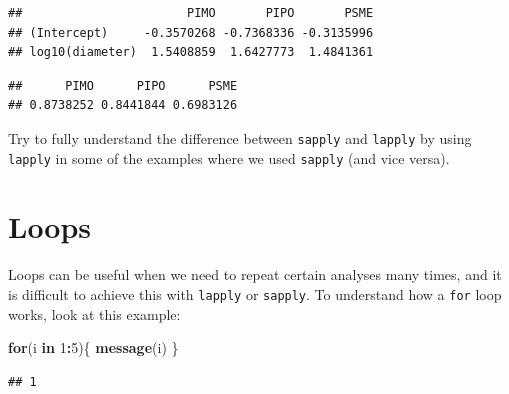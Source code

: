 \documentclass[]{book}
\newenvironment{Shaded}{\begin{snugshade}}{\end{snugshade}}
\newcommand{\CommentTok}[1]{\textcolor[rgb]{0.56,0.35,0.01}{\textit{#1}}}
\newcommand{\ControlFlowTok}[1]{\textcolor[rgb]{0.13,0.29,0.53}{\textbf{#1}}}
\newcommand{\DecValTok}[1]{\textcolor[rgb]{0.00,0.00,0.81}{#1}}
\newcommand{\KeywordTok}[1]{\textcolor[rgb]{0.13,0.29,0.53}{\textbf{#1}}}
\newcommand{\NormalTok}[1]{#1}
\newcommand{\OperatorTok}[1]{\textcolor[rgb]{0.81,0.36,0.00}{\textbf{#1}}}
\newcommand{\StringTok}[1]{\textcolor[rgb]{0.31,0.60,0.02}{#1}}
\let\BeginKnitrBlock\begin \let\EndKnitrBlock\end
\begin{document}
\begin{verbatim}
##                       PIMO       PIPO       PSME
## (Intercept)     -0.3570268 -0.7368336 -0.3135996
## log10(diameter)  1.5408859  1.6427773  1.4841361
\end{verbatim}

\begin{Shaded}
\end{Shaded}

\begin{verbatim}
##      PIMO      PIPO      PSME 
## 0.8738252 0.8441844 0.6983126
\end{verbatim}

\BeginKnitrBlock{rmdtry}
Try to fully understand the difference between \texttt{sapply} and \texttt{lapply} by using \texttt{lapply} in some of the examples where we used \texttt{sapply} (and vice versa).
\EndKnitrBlock{rmdtry}

\hypertarget{simpleloops}{%
\section{Loops}\label{simpleloops}}

Loops can be useful when we need to repeat certain analyses many times, and it is difficult to achieve this with \texttt{lapply} or \texttt{sapply}. To understand how a \texttt{for} loop works, look at this example:

\begin{Shaded}
\begin{Highlighting}[]
\ControlFlowTok{for}\NormalTok{(i }\ControlFlowTok{in} \DecValTok{1}\OperatorTok{:}\DecValTok{5}\NormalTok{)\{}
  \KeywordTok{message}\NormalTok{(i)}
\NormalTok{\}}
\end{Highlighting}
\end{Shaded}

\begin{verbatim}
## 1
\end{verbatim}
\end{document}
